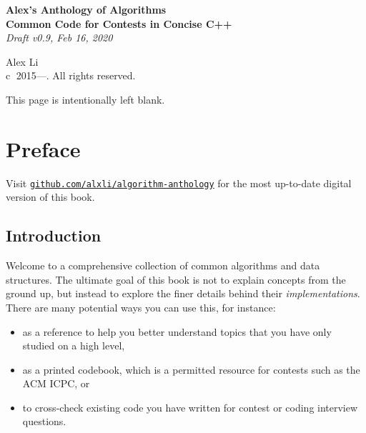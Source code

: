 \documentclass[11pt,letterpaper,twoside]{book}
\begin{document}
 
 
\frontmatter
{}

\begin{titlepage}
	\centering

	\vspace*{6 cm}

	\textbf{\LARGE Alex's Anthology of Algorithms}
	\\[1.0\baselineskip]
	\textbf{\Large Common Code for Contests in Concise C++}
	\\[1.0\baselineskip]
	{\large\textit{Draft v0.9, Feb 16, 2020}}

	\vspace*{11 cm}

	{\Large Alex Li}
	\\[0.5\baselineskip]
	{\small \textcircled{c} 2015---. All rights reserved.}
\end{titlepage}

\pagebreak
\vspace*{8 cm}
\centering

{\large This page is intentionally left blank.}

\vspace{\fill}
\makeatletter

\let\cleardoublepage\clearpage
{}
\chapter{Preface}

\raggedright
\setlength{\parskip}{0.5em}

Visit \href{https://github.com/alxli/algorithm-anthology}{\texttt{github.com/alxli/algorithm-anthology}} for the most up-to-date digital version of this book.

\section*{Introduction}

Welcome to a comprehensive collection of common algorithms and data structures. The ultimate goal of this book is not to explain concepts from the ground up, but instead to explore the finer details behind their \textit{implementations}. There are many potential ways you can use this, for instance:
\begin{itemize}
	\item as a reference to help you better understand topics that you have only studied on a high level,
	\item as a printed codebook, which is a permitted resource for contests such as the ACM ICPC, or
	\item to cross-check existing code you have written for contest or coding interview questions.
\end{itemize}
\end{document}

